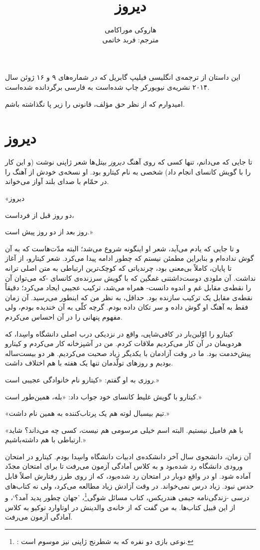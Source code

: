 \documentclass[a5paper]{book}
\title{\Huge{دیروز}}
\author{هاروکی موراکامی \\ مترجم: فربد خاتمی}
\begin{document}
\maketitle

این داستان از ترجمه‌ی انگلیسی فیلیپ گابریل که در شماره‌های ۹ و ۱۶ ژوئن سال ۲۰۱۴ نشریه‌ی نیویورکر چاپ شده‌است به فارسی برگردانده شده‌است.

امیدوارم که از نظر حق مؤلف، قانونی را زیر پا نگذاشته باشم.

\chapter*{دیروز}
تا جایی که می‌دانم، تنها کسی  که روی آهنگ \emph{دیروز} بیتل‌ها شعر ژاپنی نوشت (و این کار را با گویش کانسای انجام داد) شخصی به نام کیتارو بود. او نسخه‌ی خودش از آهنگ را در حمّام با صدای بلند آواز می‌خواند.


«دیروز


دو روز قبل از فرداست،


روز بعد از دو روز پیش است.»

و تا جایی که یادم می‌آید، شعر او اینگونه شروع می‌شد؛ البته مدّت‌هاست که به آن گوش نداده‌ام و بنابراین مطمئن نیستم که چطور ادامه پیدا می‌کرد. شعر کیتارو، از آغاز تا پایان، کاملاً بی‌معنی بود، چرندیاتی که کوچک‌ترین ارتباطی به متن اصلی ترانه نداشت. آن ملودی دوست‌داشتنی غمگین که با گویش سرزنده‌ی کانسای -که می‌توان آن را نقطه‌ی مقابل غم و اندوه دانست- همراه می‌شد، ترکیب عجیبی ایجاد می‌کرد؛ دقیقاً نقطه‌ی مقابل یک ترکیب سازنده بود. حداقل، به نظر من که اینطور می‌رسید. آن زمان فقط به آهنگ او گوش داده و سر تکان داده بودم. گرچه کلّی به آن خندیده بودم، ولی مفهوم پنهانی را در آن احساس می‌کردم.

کیتارو را اوّلین‌بار در کافی‌شاپی، واقع در نزدیکی درب اصلی دانشگاه واسِدا، که هردویمان در آن کار می‌کردیم ملاقات کردم. من در آشپزخانه کار می‌کردم و کیتارو پیش‌خدمت بود. ما در وقت آزادمان با یکدیگر زیاد صحبت می‌کردیم. هر دو بیست‌ساله بودیم و روزهای تولّدمان تنها یک هفته با هم اختلاف داشت.

روزی به او گفتم: «کیتارو نام خانوادگی عجیبی است.»

کیتارو با گویش غلیط کانسای خود جواب داد: «بله، همین‌طور است.»

«تیم بیسبال لوته هم یک پرتاب‌کننده به همین نام داشت.»

«با هم فامیل نیستیم. البته اسم خیلی مرسومی هم نیست، کسی چه می‌داند؟ شاید ارتباطی با هم داشته‌باشیم.»

آن زمان، دانشجوی سال آخر دانشکده‌ی ادبیات دانشگاه واسِدا بودم. کیتارو در امتحان ورودی دانشگاه رد شده‌بود و به کلاس آمادگی آزمون می‌رفت تا برای امتحان مجدّد آماده شود. او در واقع دوبار در امتحان رد شده‌بود، که از روی طرز رفتارش اصلاً قابل حدس نبود. زیاد درس نمی‌خواند. در وقت آزادش زیاد مطالعه می‌کرد، ولی نه کتاب‌های درسی -زندگی‌نامه جیمی هندریکس، کتاب مسائل شوگی\footnote{
: نوعی بازی دو نفره که به شطرنج ژاپنی نیز موسوم است.}،
'جهان چطور پدید آمد؟`،
و از این قبیل کتاب‌ها. به من گفت که از خانه‌ی والدینش در اوتاوارد توکیو به کلاس آمادگی آزمون می‌رفت.
\end{document}
